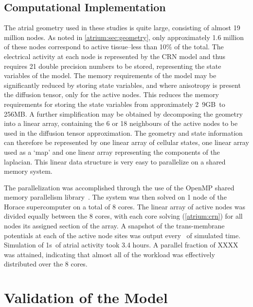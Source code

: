 \subsection{Computational Implementation}

The atrial geometry used in these studies is quite large, consisting of almost
19 million nodes.
As noted in \ref{atrium:sec:geometry}, only approximately 1.6 million of these
nodes correspond to active tissue--less than 10\% of the total.
The electrical activity at each node is represented by the CRN model and thus
requires 21 double precision numbers to be stored, representing the state
variables of the model.
The memory requirements of the model may be significantly reduced by storing
state variables, and where anisotropy is present the diffusion tensor, only for
the active nodes.
This reduces the memory requirements for storing the state variables from
approximately \unit{2.9}{GB}\ to \unit{256}{MB}.
A further simplification may be obtained by decomposing the geometry into a
linear array, containing the 6 or 18 neighbours of the active nodes to be used
in the diffusion tensor approximation.
The geometry and state information can therefore be represented by one linear
array of cellular states, one linear array used as a `map' and one
linear array representing the components of the laplacian.
This linear data structure is very easy to parallelize on a shared memory
system.

The parallelization was accomplished through the use of the OpenMP shared
memory parallelism library~\cite{OpenMP}.
The system was then solved on 1 node of the Horace supercomputer on a total of 8
cores.
The linear array of active nodes was divided equally between the 8 cores, with
each core solving (\ref{atrium:crn}) for all nodes its assigned section of the
array.
A snapshot of the trans-membrane potentials at each of the active node sites was
output every \ of simulated time.
Simulation of \unit{1}{s}\ of atrial activity took 3.4 hours.
A parallel fraction of XXXX was attained, indicating that almost all of the
workload was effectively distributed over the 8 cores.

\section{Validation of the Model}

